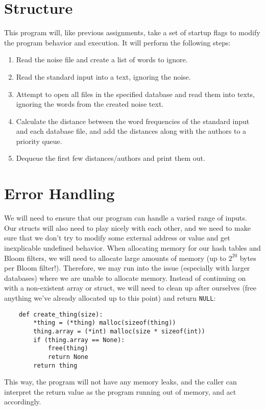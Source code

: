 \documentclass[12pt]{article}
\begin{document}
\section{Structure}

This program will, like previous assignments, take a set of startup flags to modify the program behavior and execution. It will perform the following steps:
\begin{enumerate}
    \item Read the noise file and create a list of words to ignore.
    \item Read the standard input into a text, ignoring the noise.
    \item Attempt to open all files in the specified database and read them into texts, ignoring the words from the created noise text.
    \item Calculate the distance between the word frequencies of the standard input and each database file, and add the distances along with the authors to a priority queue.
    \item Dequeue the first few distances/authors and print them out.
\end{enumerate}
\section{Error Handling}

We will need to ensure that our program can handle a varied range of inputs. Our structs will also need to play nicely with each other, and we need to make sure that we don't try to modify some external address or value and get inexplicable undefined behavior. When allocating memory for our hash tables and Bloom filters, we will need to allocate large amounts of memory (up to $2^20$ bytes per Bloom filter!). Therefore, we may run into the issue (especially with larger databases) where we are unable to allocate memory. Instead of continuing on with a non-existent array or struct, we will need to clean up after ourselves (free anything we've already allocated up to this point) and return \verb|NULL|:
\begin{verbatim}
    def create_thing(size):
        *thing = (*thing) malloc(sizeof(thing))
        thing.array = (*int) malloc(size * sizeof(int))
        if (thing.array == None):
            free(thing)
            return None
        return thing
\end{verbatim}
This way, the program will not have any memory leaks, and the caller can interpret the return value as the program running out of memory, and act accordingly.
\end{document}
